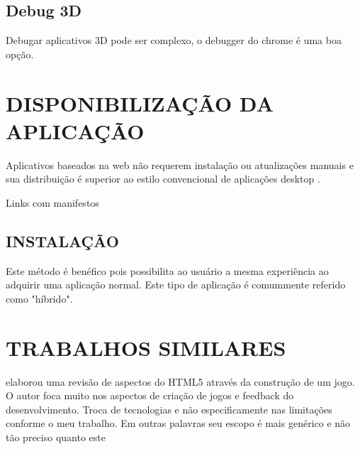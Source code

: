 \subsection{Debug 3D}
Debugar aplicativos 3D pode ser complexo, o debugger do chrome é uma boa opção.

\section{DISPONIBILIZAÇÃO DA APLICAÇÃO}
Aplicativos baseados na web não requerem instalação ou atualizações
manuais e sua distribuição é superior ao estilo convencional de
aplicações desktop \autocite{browserGamesTechnologyAndFuture}.

Links com manifestos

\subsection{INSTALAÇÃO}
Este método é benéfico pois possibilita ao usuário a mesma
experiência ao adquirir uma aplicação normal. Este tipo de
aplicação é comummente referido como "híbrido".

\section{TRABALHOS SIMILARES}
\cite{crossPlatformMobileGame} elaborou uma revisão de aspectos do
HTML5 através da construção de um jogo. O autor foca muito nos
aspectos de criação de jogos e feedback do desenvolvimento. Troca
de tecnologias e não especificamente nas limitações conforme o meu
trabalho. Em outras palavras seu escopo é mais genérico e não tão
preciso quanto este
